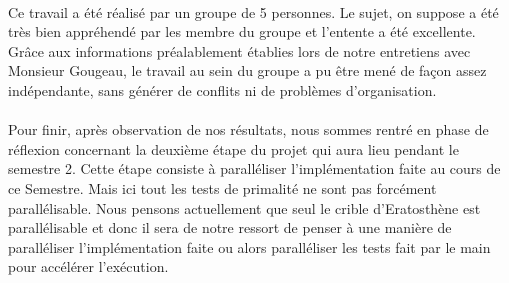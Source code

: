		\paragraph{} Ce travail a été réalisé par un groupe de 5 personnes. Le sujet, on suppose a été très bien appréhendé par les membre du groupe et l'entente a été excellente. Grâce aux informations préalablement établies lors de notre entretiens avec Monsieur Gougeau, le travail au sein du groupe a pu être mené de façon assez indépendante, sans générer de conflits ni de problèmes d'organisation.		
		\paragraph{} Pour finir, après observation de nos résultats, nous sommes rentré en phase de réflexion concernant la deuxième étape du projet qui aura lieu pendant le semestre 2. Cette étape consiste à paralléliser l'implémentation faite au cours de ce Semestre. Mais ici tout les tests de primalité ne sont pas forcément parallélisable. Nous pensons actuellement que seul le crible d'Eratosthène est parallélisable et donc il sera de notre ressort de penser à une manière de paralléliser l'implémentation faite ou alors paralléliser les tests fait par le main pour accélérer l'exécution.

